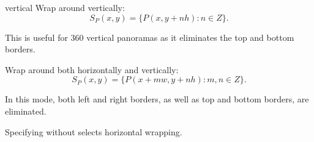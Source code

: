 \begin{codelist}
\begin{codelist}
  \item[vertical]\itemend
    Wrap around vertically:
    \[
    S_P(x, y) = \{P(x, y + n h): n \in Z\}.
    \]

    This is useful for 360\angulardegree{} vertical panoramas as it eliminates the top and
    bottom borders.

  \item[\itempar{both \\ horizontal+vertical
      \\ vertical+horizontal}]\itemend
    Wrap around both horizontally and vertically:
    \[
    S_P(x, y) = \{P(x + m w, y + n h): m, n \in Z\}.
    \]

    In this mode, both left and right borders, as well as top and bottom borders, are
    eliminated.
  \end{codelist}

  Specifying  without  selects horizontal
  wrapping.
\end{codelist}



